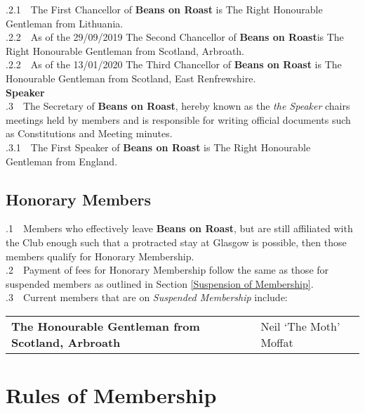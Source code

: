 \documentclass[a4paper,11pt]{article}
\begin{document}
.2.1$\quad$The First Chancellor of \textbf{Beans on Roast} is The Right Honourable Gentleman from Lithuania.\\
.2.2$\quad$As of the 29/09/2019 The Second Chancellor of \textbf{Beans on Roast}is The Right Honourable Gentleman from Scotland, Arbroath.\\
.2.2$\quad$As of the 13/01/2020 The Third Chancellor of \textbf{Beans on Roast} is The Honourable Gentleman from Scotland, East Renfrewshire.\\


\textbf{Speaker}\\

.3$\quad$The Secretary of \textbf{Beans on Roast}, hereby known as the \textit{the Speaker} chairs meetings held by members and is responsible for writing official documents such as Constitutions and Meeting minutes.\\ 

.3.1$\quad$The First Speaker of \textbf{Beans on Roast} is The Right Honourable Gentleman from England.\\
\subsection{Honorary Members}
\label{Honorary Members??}
.1$\quad$Members who effectively leave \textbf{Beans on Roast}, but are still affiliated with the Club enough such that a protracted stay at Glasgow is possible, then those members qualify for Honorary Membership.\\

.2$\quad$Payment of fees for Honorary Membership follow the same as those for suspended members as outlined in Section \ref{Suspension of Membership}.\\

.3$\quad$Current members that are on \textit{Suspended Membership} include:
\begin{table}[h!]
\begin{tabular}{ll}
\textbf{The Honourable Gentleman from  Scotland, Arbroath} & Neil `The Moth' Moffat \\
\end{tabular}
\end{table}

\section{Rules of Membership}
\label{Rules of Membership}
\end{document}
